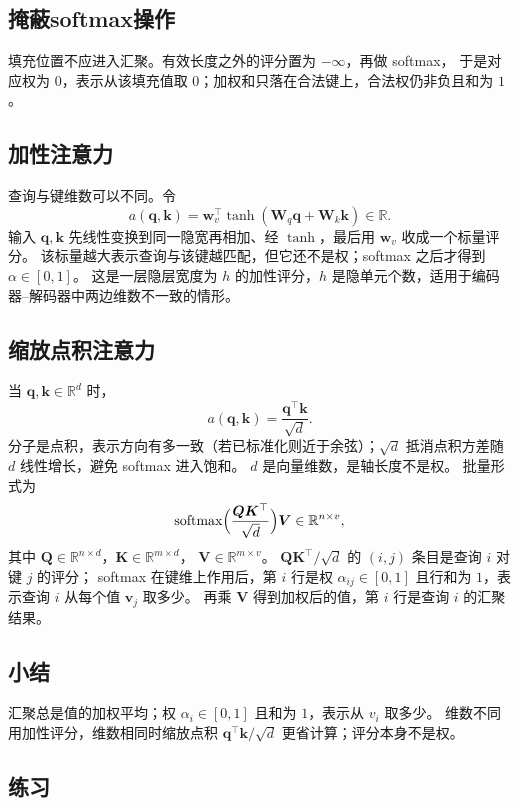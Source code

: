 \subsection{掩蔽softmax操作}

填充位置不应进入汇聚。有效长度之外的评分置为 $-\infty$，再做 softmax，
于是对应权为 $0$，表示从该填充值取 $0$；加权和只落在合法键上，合法权仍非负且和为 $1$。

\subsection{加性注意力}

查询与键维数可以不同。令
\[
a(\bm{q},\bm{k})=\bm{w}_{v}^{\top}\tanh(\bm{W}_{q}\bm{q}+\bm{W}_{k}\bm{k})\in\mathbb{R}.
\]
输入 $\bm{q},\bm{k}$ 先线性变换到同一隐宽再相加、经 $\tanh$，最后用 $\bm{w}_v$ 收成一个标量评分。
该标量越大表示查询与该键越匹配，但它还不是权；softmax 之后才得到 $\alpha\in[0,1]$。
这是一层隐层宽度为 $h$ 的加性评分，$h$ 是隐单元个数，适用于编码器--解码器中两边维数不一致的情形。

\subsection{缩放点积注意力}

当 $\bm{q},\bm{k}\in\mathbb{R}^{d}$ 时，
\[
a(\bm{q},\bm{k})=\frac{\bm{q}^{\top}\bm{k}}{\sqrt{d}}.
\]
分子是点积，表示方向有多一致（若已标准化则近于余弦）；$\sqrt{d}$ 抵消点积方差随 $d$ 线性增长，避免 softmax 进入饱和。
$d$ 是向量维数，是轴长度不是权。
批量形式为
\[
\operatorname{softmax}\Bigl(\frac{\bm{Q}\bm{K}^{\top}}{\sqrt{d}}\Bigr)\bm{V}
\in\mathbb{R}^{n\times v},
\]
其中 $\bm{Q}\in\mathbb{R}^{n\times d}$，$\bm{K}\in\mathbb{R}^{m\times d}$，
$\bm{V}\in\mathbb{R}^{m\times v}$。
$\bm{Q}\bm{K}^{\top}/\sqrt{d}$ 的 $(i,j)$ 条目是查询 $i$ 对键 $j$ 的评分；
softmax 在键维上作用后，第 $i$ 行是权 $\alpha_{ij}\in[0,1]$ 且行和为 $1$，表示查询 $i$ 从每个值 $\bm{v}_j$ 取多少。
再乘 $\bm{V}$ 得到加权后的值，第 $i$ 行是查询 $i$ 的汇聚结果。

\subsection{小结}

汇聚总是值的加权平均；权 $\alpha_i\in[0,1]$ 且和为 $1$，表示从 $v_i$ 取多少。
维数不同用加性评分，维数相同时缩放点积
$\bm{q}^{\top}\bm{k}/\sqrt{d}$ 更省计算；评分本身不是权。

\subsection{练习}


